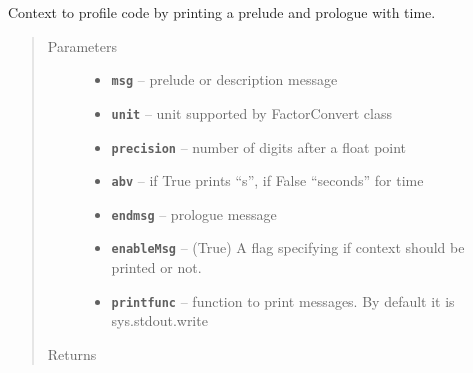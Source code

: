\documentclass[letterpaper,10pt,english]{sphinxmanual}
\begin{document}
\begin{fulllineitems}
\label{RRtoolbox.lib:RRtoolbox.lib.root.TimeCode}
Context to profile code by printing a prelude and prologue with time.
\begin{quote}\begin{description}
\item[{Parameters}] \leavevmode\begin{itemize}
\item {} 
\textbf{\texttt{msg}} -- prelude or description message

\item {} 
\textbf{\texttt{unit}} -- unit supported by FactorConvert class

\item {} 
\textbf{\texttt{precision}} -- number of digits after a float point

\item {} 
\textbf{\texttt{abv}} -- if True prints ``s'', if False ``seconds'' for time

\item {} 
\textbf{\texttt{endmsg}} -- prologue message

\item {} 
\textbf{\texttt{enableMsg}} -- (True) A flag specifying if context
should be printed or not.

\item {} 
\textbf{\texttt{printfunc}} -- function to print messages. By default it
is sys.stdout.write

\end{itemize}

\item[{Returns}] \leavevmode


\end{description}\end{quote}

\end{fulllineitems}

\end{document}
